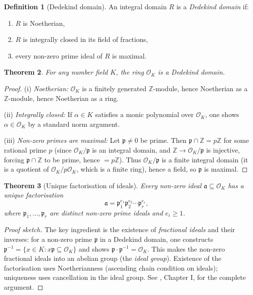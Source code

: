 \documentclass[12pt,a4paper]{amsart}
\newtheorem{theorem}{Theorem}[section]
\theoremstyle{definition}
\newtheorem{definition}[theorem]{Definition}
\newcommand{\Z}{\mathbb{Z}}
\newcommand{\OK}{\mathcal{O}_K}
\newcommand{\p}{\mathfrak{p}}
\newcommand{\aaa}{\mathfrak{a}}
\begin{document}
\begin{definition}[Dedekind domain]
\label{def:dedekind}
An integral domain $R$ is a \emph{Dedekind domain} if:
\begin{enumerate}[label=(\roman*)]
  \item $R$ is Noetherian,
  \item $R$ is integrally closed in its field of fractions,
  \item every non-zero prime ideal of $R$ is maximal.
\end{enumerate}
\end{definition}

\begin{theorem}
\label{thm:OK_dedekind}
For any number field $K$, the ring $\OK$ is a Dedekind domain.
\end{theorem}

\begin{proof}
(i) \emph{Noetherian:} $\OK$ is a finitely generated $\Z$-module, hence
Noetherian as a $\Z$-module, hence Noetherian as a ring.

(ii) \emph{Integrally closed:} If $\alpha \in K$ satisfies a monic polynomial
over $\OK$, one shows $\alpha \in \OK$ by a standard norm argument.

(iii) \emph{Non-zero primes are maximal:} Let $\p \ne 0$ be prime.
Then $\p \cap \Z = p\Z$ for some rational prime $p$ (since $\OK/\p$
is an integral domain, and $\Z \to \OK/\p$ is injective, forcing $\p \cap \Z$
to be prime, hence $= p\Z$).
Thus $\OK/\p$ is a finite integral domain (it is a quotient of $\OK/p\OK$,
which is a finite ring), hence a field, so $\p$ is maximal.
\end{proof}

\begin{theorem}[Unique factorisation of ideals]
\label{thm:ufid}
Every non-zero ideal $\aaa \subseteq \OK$ has a unique factorisation
\[
  \aaa = \p_1^{e_1} \p_2^{e_2} \cdots \p_r^{e_r},
\]
where $\p_1, \ldots, \p_r$ are distinct non-zero prime ideals and $e_i \ge 1$.
\end{theorem}

\begin{proof}[Proof sketch]
The key ingredient is the existence of \emph{fractional ideals} and their
inverses: for a non-zero prime $\p$ in a Dedekind domain, one constructs
$\p^{-1} = \{x \in K : x\p \subseteq \OK\}$ and shows $\p \cdot \p^{-1} = \OK$.
This makes the non-zero fractional ideals into an abelian group (the
\emph{ideal group}).  Existence of the factorisation uses Noetherianness
(ascending chain condition on ideals); uniqueness uses cancellation in
the ideal group.  See \cite{Neukirch1999}, Chapter I, for the complete argument.
\end{proof}
\end{document}
